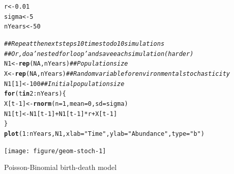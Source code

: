 \documentclass[12pt]{article}\usepackage[]{graphicx}\usepackage[]{color}
\makeatletter
\newcommand{\hlnum}[1]{\textcolor[rgb]{0.686,0.059,0.569}{#1}}%
\newcommand{\hlstr}[1]{\textcolor[rgb]{0.192,0.494,0.8}{#1}}%
\newcommand{\hlcom}[1]{\textcolor[rgb]{0.678,0.584,0.686}{\textit{#1}}}%
\newcommand{\hlopt}[1]{\textcolor[rgb]{0,0,0}{#1}}%
\newcommand{\hlstd}[1]{\textcolor[rgb]{0.345,0.345,0.345}{#1}}%
\newcommand{\hlkwa}[1]{\textcolor[rgb]{0.161,0.373,0.58}{\textbf{#1}}}%
\newcommand{\hlkwb}[1]{\textcolor[rgb]{0.69,0.353,0.396}{#1}}%
\newcommand{\hlkwc}[1]{\textcolor[rgb]{0.333,0.667,0.333}{#1}}%
\newcommand{\hlkwd}[1]{\textcolor[rgb]{0.737,0.353,0.396}{\textbf{#1}}}%
\newenvironment{kframe}{%
 \def\at@end@of@kframe{}%
 \ifinner\ifhmode%
  \def\at@end@of@kframe{\end{minipage}}%
  \begin{minipage}{\columnwidth}%
 \fi\fi%
 \def\FrameCommand##1{\hskip\@totalleftmargin \hskip-\fboxsep
 \colorbox{shadecolor}{##1}\hskip-\fboxsep
     \hskip-\linewidth \hskip-\@totalleftmargin \hskip\columnwidth}%
 \MakeFramed {\advance\hsize-\width
   \@totalleftmargin\z@ \linewidth\hsize
   \@setminipage}}%
 {\par\unskip\endMakeFramed%
 \at@end@of@kframe}
\newenvironment{knitrout}{}{} %
\makeatother
\begin{document}
\begin{knitrout}
\color{fgcolor}\begin{kframe}
\begin{alltt}
\hlstd{r} \hlkwb{<-} \hlnum{0.01}
\hlstd{sigma} \hlkwb{<-} \hlnum{5}
\hlstd{nYears} \hlkwb{<-} \hlnum{50}

\hlcom{## Repeat the next steps 10 times to do 10 simulations}
\hlcom{## Or, do a 'nested for loop' and save each simulation (harder)}
\hlstd{N1} \hlkwb{<-} \hlkwd{rep}\hlstd{(}\hlnum{NA}\hlstd{, nYears)}  \hlcom{## Population size }
\hlstd{X} \hlkwb{<-} \hlkwd{rep}\hlstd{(}\hlnum{NA}\hlstd{, nYears)}   \hlcom{## Random variable for environmental stochasticity}
\hlstd{N1[}\hlnum{1}\hlstd{]} \hlkwb{<-} \hlnum{100}           \hlcom{## Initial population size}
\hlkwa{for}\hlstd{(t} \hlkwa{in} \hlnum{2}\hlopt{:}\hlstd{nYears) \{}
    \hlstd{X[t}\hlopt{-}\hlnum{1}\hlstd{]} \hlkwb{<-} \hlkwd{rnorm}\hlstd{(}\hlkwc{n}\hlstd{=}\hlnum{1}\hlstd{,} \hlkwc{mean}\hlstd{=}\hlnum{0}\hlstd{,} \hlkwc{sd}\hlstd{=sigma)}
    \hlstd{N1[t]} \hlkwb{<-} \hlstd{N1[t}\hlopt{-}\hlnum{1}\hlstd{]} \hlopt{+} \hlstd{N1[t}\hlopt{-}\hlnum{1}\hlstd{]}\hlopt{*}\hlstd{r} \hlopt{+} \hlstd{X[t}\hlopt{-}\hlnum{1}\hlstd{]}
\hlstd{\}}
\hlkwd{plot}\hlstd{(}\hlnum{1}\hlopt{:}\hlstd{nYears, N1,} \hlkwc{xlab}\hlstd{=}\hlstr{"Time"}\hlstd{,} \hlkwc{ylab}\hlstd{=}\hlstr{"Abundance"}\hlstd{,} \hlkwc{type}\hlstd{=}\hlstr{"b"}\hlstd{)}
\end{alltt}
\end{kframe}

{\centering \texttt{[image: figure/geom-stoch-1]} 

}


\end{knitrout}


\newpage

Poisson-Binomial birth-death model
\end{document}
